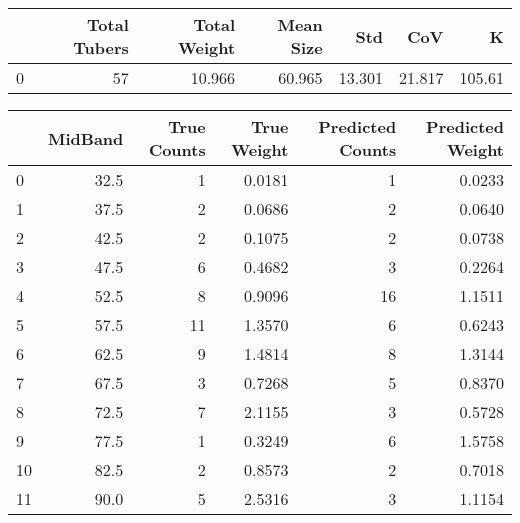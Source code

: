 \begin{tabular}{lrrrrrr}
\toprule
{} &  Total Tubers &  Total Weight &  Mean Size &     Std &     CoV &       K \\
\midrule
0 &            57 &        10.966 &     60.965 &  13.301 &  21.817 &  105.61 \\
\bottomrule
\end{tabular}

\begin{tabular}{lrrrrr}
\toprule
{} &  MidBand &  True Counts &  True Weight &  Predicted Counts &  Predicted Weight \\
\midrule
0  &     32.5 &            1 &       0.0181 &                 1 &            0.0233 \\
1  &     37.5 &            2 &       0.0686 &                 2 &            0.0640 \\
2  &     42.5 &            2 &       0.1075 &                 2 &            0.0738 \\
3  &     47.5 &            6 &       0.4682 &                 3 &            0.2264 \\
4  &     52.5 &            8 &       0.9096 &                16 &            1.1511 \\
5  &     57.5 &           11 &       1.3570 &                 6 &            0.6243 \\
6  &     62.5 &            9 &       1.4814 &                 8 &            1.3144 \\
7  &     67.5 &            3 &       0.7268 &                 5 &            0.8370 \\
8  &     72.5 &            7 &       2.1155 &                 3 &            0.5728 \\
9  &     77.5 &            1 &       0.3249 &                 6 &            1.5758 \\
10 &     82.5 &            2 &       0.8573 &                 2 &            0.7018 \\
11 &     90.0 &            5 &       2.5316 &                 3 &            1.1154 \\
\bottomrule
\end{tabular}


